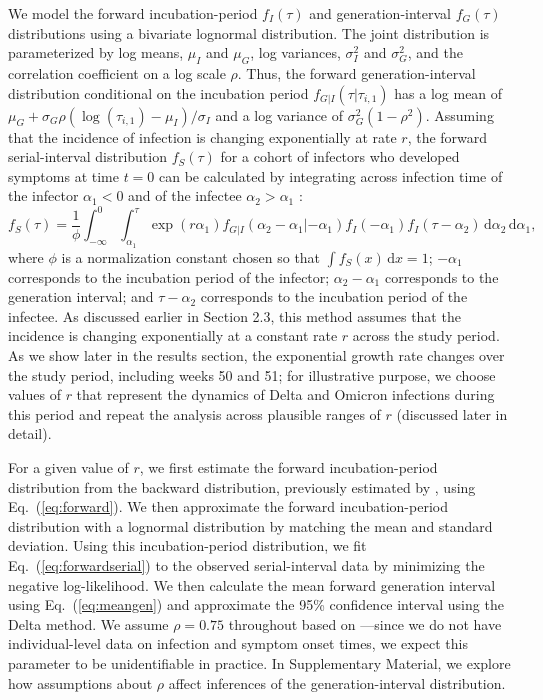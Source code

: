 \documentclass[12pt]{article}
\newcommand{\eref}[1]{Eq.~(\ref{eq:#1})}
\newcommand{\dd}[1]{\ensuremath{\, \mathrm{d}#1}}
\newcommand{\dx}{\dd{x}}
\begin{document}
We model the forward incubation-period $f_I(\tau)$ and generation-interval $f_G(\tau)$ distributions using a bivariate lognormal distribution.
The joint distribution is parameterized by log means, $\mu_I$ and $\mu_G$, log variances, $\sigma_I^2$ and $\sigma_G^2$, and the correlation coefficient on a log scale $\rho$.
Thus, the forward generation-interval distribution conditional on the incubation period $f_{G|I}(\tau|\tau_{i,1})$ has a log mean of $\mu_G + \sigma_G \rho (\log(\tau_{i, 1}) - \mu_I)/\sigma_I$ and a log variance of $\sigma_G^2 (1 - \rho^2)$.
Assuming that the incidence of infection is changing exponentially at rate $r$, the forward serial-interval distribution $f_S(\tau)$ for a cohort of infectors who developed symptoms at time $t = 0$ can be calculated by integrating across infection time of the infector $\alpha_1 < 0$ and of the infectee $\alpha_2 > \alpha_1$ \citep{park2021forward}:
\begin{equation}
f_S(\tau) = \frac{1}{\phi} \int_{-\infty}^0\int_{\alpha_1}^\tau \exp(r \alpha_1) f_{G|I}(\alpha_2 - \alpha_1|- \alpha_1) f_I(- \alpha_1) f_I(\tau - \alpha_2) \dd \alpha_2 \dd \alpha_1,
\label{eq:forwardserial}
\end{equation}
where $\phi$ is a normalization constant chosen so that $\int f_S(x) \dx = 1$;
$-\alpha_1$ corresponds to the incubation period of the infector;
$\alpha_2 - \alpha_1$ corresponds to the generation interval;
and $\tau - \alpha_2$ corresponds to the incubation period of the infectee.
As discussed earlier in Section 2.3, this method assumes that the incidence is changing exponentially at a constant rate $r$ across the study period.
As we show later in the results section, the exponential growth rate changes over the study period, including weeks 50 and 51;
for illustrative purpose, we choose values of $r$ that represent the dynamics of Delta and Omicron infections during this period and repeat the analysis across plausible ranges of $r$ (discussed later in detail).

For a given value of $r$, we first estimate the forward incubation-period distribution from the backward distribution, previously estimated by \cite{backer2021omicron}, using \eref{forward}.
We then approximate the forward incubation-period distribution with a lognormal distribution by matching the mean and standard deviation.
Using this incubation-period distribution, we fit \eref{forwardserial} to the observed serial-interval data by minimizing the negative log-likelihood.
We then calculate the mean forward generation interval using \eref{meangen} and approximate the 95\% confidence interval using the Delta method.
We assume $\rho = 0.75$ throughout based on \cite{sender2021unmitigated}---since we do not have individual-level data on infection and symptom onset times, we expect this parameter to be unidentifiable in practice.
In Supplementary Material, we explore how assumptions about $\rho$ affect inferences of the generation-interval distribution.
\end{document}
